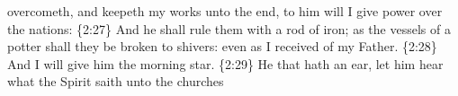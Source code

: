 overcometh, and keepeth my works unto the end, to him will I give power over the nations: \{2:27\} And he shall rule them with a rod of iron; as the vessels of a potter shall they be broken to shivers: even as I received of my Father. \{2:28\} And I will give him the morning star. \{2:29\} He that hath an ear, let him hear what the Spirit saith unto the churches
